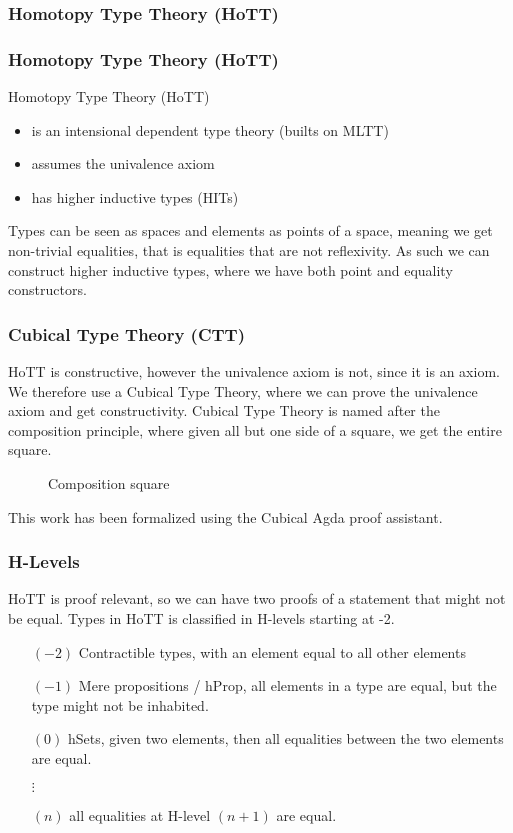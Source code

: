 \documentclass[xelatex,mathserif,serif,notheorems]{beamer} %
\theoremstyle{plain} %
\theoremstyle{definition}
\theoremstyle{remark}
\newcommand*{\pathterm}[1]{\textcolor{green!65!red!75!black}{#1}}
\newcommand*{\type}[1]{\textcolor{magenta!90!black}{#1}}
\newcommand{\ct}{%
  \mathchoice{\mathbin{\raisebox{0.5ex}{$\displaystyle\centerdot$}}}%
             {\mathbin{\raisebox{0.5ex}{$\centerdot$}}}%
             {\mathbin{\raisebox{0.25ex}{$\scriptstyle\,\centerdot\,$}}}%
             {\mathbin{\raisebox{0.1ex}{$\scriptscriptstyle\,\centerdot\,$}}}
}
\begin{document}
\subsubsection{Homotopy Type Theory (HoTT)}
\begin{frame}
  \frametitle{Homotopy Type Theory (HoTT)}
  Homotopy Type Theory (HoTT)
  \begin{itemize}
  \item is an intensional dependent type theory (builts on MLTT)
  \item assumes the univalence axiom
  \item has higher inductive types (HITs)
  \end{itemize}
  Types can be seen as spaces and elements as points of a space, meaning we get non-trivial equalities, that is equalities that are not reflexivity. As such we can construct higher inductive types, where we have both point and equality constructors.
\end{frame}

\begin{frame}[fragile]
  \frametitle{Cubical Type Theory (CTT)}
  HoTT is constructive, however the univalence axiom is not, since it is an axiom. We therefore use a Cubical Type Theory, where we can prove the univalence axiom and get constructivity. Cubical Type Theory is named after the composition principle, where given all but one side of a square, we get the entire square.
  \begin{figure}[h]
    \centering
    \caption{Composition square}
    \label{fig:cubical-composition-square}
  \end{figure}
  This work has been formalized using the Cubical Agda proof assistant.
\end{frame}

\begin{frame}
  \frametitle{H-Levels}
  HoTT is proof relevant, so we can have two proofs of a statement that might not be equal. Types in HoTT is classified in H-levels starting at -2.
  \begin{itemize}
  \item[\((-2)\)] Contractible types, with an element equal to all other elements
  \item[\((-1)\)] Mere propositions / hProp, all elements in a type are equal, but the type might not be inhabited.
  \item[\((0)\)] hSets, given two elements, then all equalities between the two elements are equal.
    \\
    \strut\hspace{-5mm}\(\vdots\)
  \item[\((n)\)] all equalities at H-level \((n+1)\) are equal.
  \end{itemize}
\end{frame}
\end{document}
